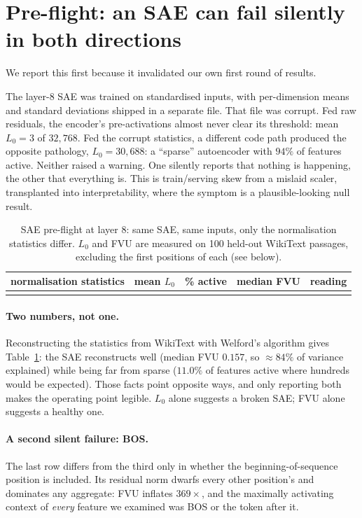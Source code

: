 \documentclass{article}
\begin{document}
\section{Pre-flight: an SAE can fail silently in both directions}
\label{sec:preflight}

We report this first because it invalidated our own first round of results.

The layer-8 SAE was trained on standardised inputs, with per-dimension means and standard
deviations shipped in a separate file. That file was corrupt. Fed raw residuals, the
encoder's pre-activations almost never clear its threshold: mean $L_0 = 3$ of
$32{,}768$. Fed the corrupt statistics, a different code path produced the opposite
pathology, $L_0 = 30{,}688$: a ``sparse'' autoencoder with $94\%$ of features active.
Neither raised a warning. One silently reports that nothing is happening, the other that
everything is. This is train/serving skew from a mislaid scaler, transplanted into
interpretability, where the symptom is a plausible-looking null result.

\begin{table}[t]
\centering
\caption{SAE pre-flight at layer 8: same SAE, same inputs, only the normalisation
statistics differ. $L_0$ and FVU are measured on 100 held-out WikiText passages,
excluding the first positions of each (see below).}
\label{tab:preflight}
\small
\begin{tabular}{lrrrl}
\toprule
normalisation statistics & mean $L_0$ & \% active & median FVU & reading \\
\midrule
 \\
\bottomrule
\end{tabular}
\end{table}

\paragraph{Two numbers, not one.}
Reconstructing the statistics from WikiText with Welford's algorithm gives
Table~\ref{tab:preflight}: the SAE reconstructs well (median FVU $0.157$, so $\approx
84\%$ of variance explained) while being far from sparse ($11.0\%$ of features active
where hundreds would be expected). Those facts point opposite ways, and only reporting
both makes the operating point legible. $L_0$ alone suggests a broken SAE; FVU alone
suggests a healthy one.

\paragraph{A second silent failure: BOS.}
The last row differs from the third only in whether the beginning-of-sequence position is
included. Its residual norm dwarfs every other position's and dominates any aggregate:
FVU inflates $369\times$, and the maximally activating context of \emph{every} feature we
examined was BOS or the token after it.
\end{document}
